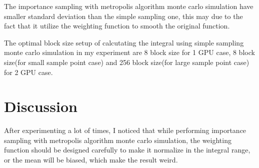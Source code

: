 \documentclass{article}
\begin{document}
	The importance sampling with metropolis algorithm monte carlo simulation have smaller standard deviation than the simple sampling one, this may due to the fact that it utilize the weighting function to smooth the original function.
		
	The optimal block size setup of calcutating the integral using simple sampling monte carlo simulation in my experiment are 8 block size for 1 GPU case, 8 block size(for small sample point case) and 256 block size(for large sample point case) for 2 GPU case.
	
	\section{Discussion}
	After experimenting a lot of times, I noticed that while performing importance sampling with metropolis algorithm monte carlo simulation, the weighting function should be designed carefully to make it normalize in the integral range, or the mean will be biased, which make the result weird.
\end{document}
